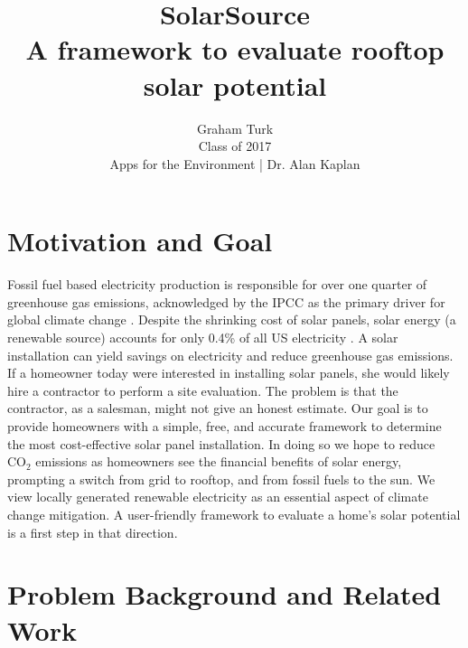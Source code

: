 \documentclass[pageno]{jpaper}
\begin{document}
\title{{\huge SolarSource} \\ {\large A framework to evaluate rooftop solar potential}}
\author{Graham Turk \\ {\normalsize Class of 2017} \\ {\normalsize Apps for the Environment | Dr. Alan Kaplan}}

\date{}
\maketitle

\thispagestyle{empty}

\section{Motivation and Goal}
\indent Fossil fuel based electricity production is responsible for over one quarter of greenhouse gas emissions, acknowledged by the IPCC as the primary driver for global climate change \cite{IPCC}. Despite the shrinking cost of solar panels, solar energy (a renewable source) accounts for only 0.4\% of all US electricity \cite{USEIA}. A solar installation can yield savings on electricity and reduce greenhouse gas emissions. \newline
\newline
\indent If a homeowner today were interested in installing solar panels, she would likely hire a contractor to perform a site evaluation. The problem is that the contractor, as a salesman, might not give an honest estimate. Our goal is to provide homeowners with a simple, free, and accurate framework to determine the most cost-effective solar panel installation. In doing so we hope to reduce $\mbox{CO}_2$ emissions as homeowners see the financial benefits of solar energy, prompting a switch from grid to rooftop, and from fossil fuels to the sun. We view locally generated renewable electricity as an essential aspect of climate change mitigation. A user-friendly framework to evaluate a home's solar potential is a first step in that direction.

\section{Problem Background and Related Work}
\end{document}
